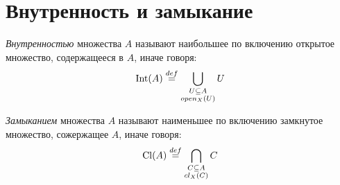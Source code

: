 \section{Внутренность и замыкание}

\begin{definition}
    \textit{Внутренностью} множества $A$ называют наибольшее по включению
    открытое множество, содержащееся в $A$, иначе говоря:
\[
    \operatorname{Int}(A) \overset{def}{\underset{}{=}} \bigcup_{\substack{U \subseteq A \\open_X(U)}}{U}
\]
\end{definition}

\begin{definition}
    \textit{Замыканием} множества $A$ называют наименьшее по включению
    замкнутое множество, сожержащее $A$, иначе говоря:
\[
    \operatorname{Cl}(A) \overset{def}{\underset{}{=}} \bigcap_{\substack{C \subseteq A \\cl_X(C)}}{C}
\]
\end{definition}

